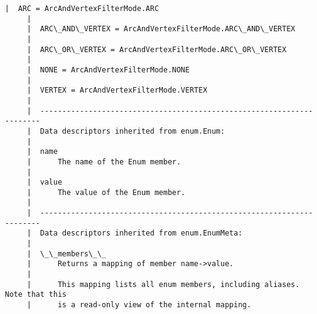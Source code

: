 \documentclass[11pt]{article}
\begin{document}
\begin{Verbatim}[commandchars=\\\{\}]
     |  ARC = ArcAndVertexFilterMode.ARC
     |  
     |  ARC\_AND\_VERTEX = ArcAndVertexFilterMode.ARC\_AND\_VERTEX
     |  
     |  ARC\_OR\_VERTEX = ArcAndVertexFilterMode.ARC\_OR\_VERTEX
     |  
     |  NONE = ArcAndVertexFilterMode.NONE
     |  
     |  VERTEX = ArcAndVertexFilterMode.VERTEX
     |  
     |  ----------------------------------------------------------------------
     |  Data descriptors inherited from enum.Enum:
     |  
     |  name
     |      The name of the Enum member.
     |  
     |  value
     |      The value of the Enum member.
     |  
     |  ----------------------------------------------------------------------
     |  Data descriptors inherited from enum.EnumMeta:
     |  
     |  \_\_members\_\_
     |      Returns a mapping of member name->value.
     |      
     |      This mapping lists all enum members, including aliases. Note that this
     |      is a read-only view of the internal mapping.
    

\end{Verbatim}
\end{document}
